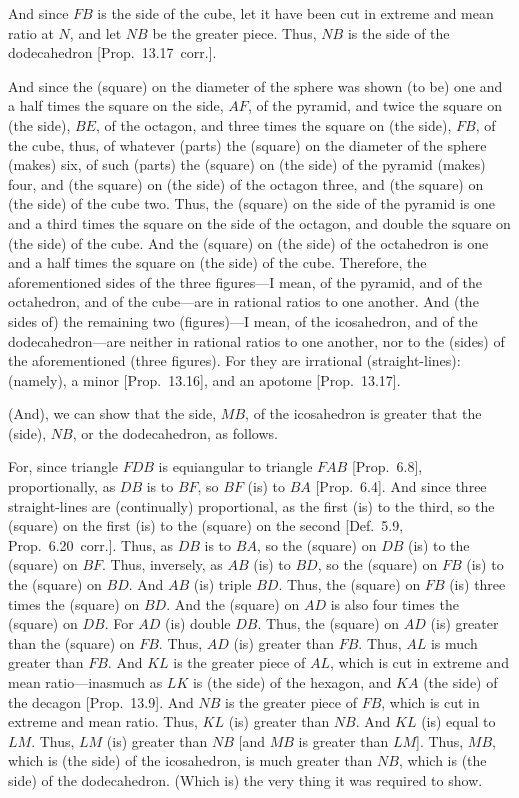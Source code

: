 \begin{Parallel}{}{}
{And since $FB$ is the side of the cube, let it have been cut in extreme and
mean ratio at $N$, and let $NB$ be the greater piece. Thus, $NB$
is the side of the dodecahedron [Prop.~13.17~corr.].

And since the (square) on the diameter of the sphere was shown (to be)
one and a half times the square on the side, $AF$,  of the pyramid,
and twice the square on (the side), $BE$,  of the octagon, and
three times the square on (the side), $FB$, of the cube, 
thus, of whatever (parts) the (square) on the diameter of the
sphere (makes) six, of such (parts) the (square) on (the side) of the pyramid (makes)
four, and (the square) on (the side) of the octagon three, and (the
square) on (the side) of the cube  two. Thus, the (square) on the
side of the pyramid is one and a third times the square on the side of the
octagon, and double the square on (the side) of the cube. 
And the (square) on (the side) of the octahedron is one and a half
times the square on (the side) of the cube. Therefore, the aforementioned
sides of the three figures---I mean, of the pyramid, and of the octahedron, and 
of the cube---are
in rational ratios to one another. And (the sides of) the remaining two (figures)---I mean, of
the icosahedron, and of the dodecahedron---are neither in rational ratios to
one another, nor to the (sides) of the aforementioned (three figures). For they are
irrational (straight-lines): (namely), a minor [Prop.~13.16], and 
an apotome [Prop.~13.17].

(And), we can show that the side, $MB$, of the icosahedron is greater
that the (side), $NB$, or the dodecahedron, as follows.

For, since triangle $FDB$ is equiangular to triangle $FAB$ [Prop.~6.8],
proportionally, as $DB$ is to $BF$, so $BF$ (is) to $BA$ [Prop.~6.4]. 
And since three straight-lines are (continually) proportional, as the
first (is) to the third, so the (square) on the first (is) to the (square) on the
second [Def.~5.9, Prop.~6.20~corr.]. Thus, as $DB$ is to $BA$, so the (square) on $DB$
(is) to the (square) on $BF$. Thus, inversely, as $AB$ (is) to $BD$, so the
(square) on $FB$ (is) to the (square) on $BD$. And $AB$ (is) triple
$BD$. Thus, the (square) on $FB$ (is) three times the (square)
on $BD$. And the (square) on $AD$ is also four times the (square)
on $DB$. For $AD$ (is) double $DB$. Thus, the (square) on $AD$
(is) greater than the (square) on $FB$.  Thus, $AD$ (is) greater than
$FB$. 
Thus, $AL$ is much greater than $FB$. And $KL$ is the greater piece of $AL$, which is cut in extreme and
mean ratio---inasmuch as $LK$ is (the side) of the hexagon, and $KA$
(the side) of the decagon [Prop.~13.9]. And $NB$
is the greater piece of $FB$, which is cut in extreme and mean ratio. 
Thus, $KL$ (is) greater than $NB$.  And $KL$ (is) equal to $LM$. 
Thus, $LM$ (is) greater than $NB$ [and $MB$ is greater than $LM$].
Thus, $MB$, which is (the side) of the icosahedron, is much greater
than $NB$, which is (the side) of the dodecahedron.  (Which is)
the very thing it was required to show.}
\end{Parallel}
